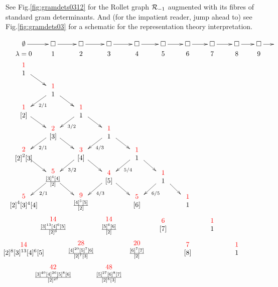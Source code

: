 \documentclass{article}
\theoremstyle{definition}
\numberwithin{equation}{subsection}
\begin{document}
See Fig.\ref{fig:gramdets0312} for the Rollet graph ${\mathcal{R}}_{-1}$ augmented with its fibres of standard gram determinants.
And 
(for the impatient reader, jump ahead to)
see Fig.\ref{fig:gramdets03} for a schematic for the representation theory interpretation. 

\begin{figure} 

%
\newcommand{\du}[2]{\begin{array}{c} \textcolor{red}{{#1}} \\ \hspace{-.321in}{#2}\hspace{-.321in} \end{array}}
\newcommand{\sqrr}{\square\ar[r]}
%
%
\[ { } \hspace{-.253in}
%
\xymatrix @C=15pt @R=1pt {
  {\emptyset}\ar[r] & \sqrr & \sqrr & \sqrr & \sqrr & \sqrr & \sqrr & \sqrr & \sqrr & \sqrr & { }
  \\
  {\lambda=0  }       &  1             &  2      &  3  &  4  &  5   & 6 & 7 & 8 & 9 
  \\  %
    {\du{1}{1} }\ar[dr]
    \\
& {\du{1}{1}}\ar[dr]\ar[dl]^{2/1}
\\ 
{\du{1}{{[2]}} }\ar[dr]    &                  &
{\du{1}{1}}\ar[dr]\ar[dl]^{3/2}
\\
&{\du{2}{[3]}} \ar[dr]\ar[dl]^{2/1}               &     &
{\du{1}{1}}\ar[dr]\ar[dl]^{4/3}
\\ 
{ \du{2}{{[ 2]}^2 [3]}}  \ar[dr]  &                     &
{\du{3}{[4]} }  \ar[dr]\ar[dl]^{3/2}  &    &
{\du{1}{1} } \ar[dr]\ar[dl]^{5/4}
\\
    & {\du{5}{{\frac{ [3]^4 [4]}{[2]}^{}}}}  \ar[dr]\ar[dl]^{2/1}   &  &
    {\du{4}{[5]}} \ar[dr]\ar[dl]^{4/3} &  &
    {\du{1}{1}} \ar[dr]\ar[dl]^{6/5}
    \\ 
    {\du{5}{{[2]}^4 [3]^4 [4]}} &              &
    {\du{9}{{\frac{[4]^5[5]}{[2]}^{}}}} &    &
    {\du{5}{[6]}} & &{ \du{1}{1} }
    \\ 
    &{\du{14}{\frac{[3]^{13}[4]^6[5]}{[2]^{6}}}} &&
    {\du{14}{\frac{[5]^6[6]}{[2]^{}}}} &&
    {\du{6}{[7]}} &&
    {\du{1}{1}}
 \\
   {\du{14}{[2]^8[3]^{13}[4]^6[5]}}  &&
   {\du{28}{\frac{[4]^{20}[5]^7[6]}{[2]^{7}[3]^{}}}} &&
   {\du{20}{\frac{[6]^7[7]}{[2]^{}}}} &&
   {\du{7}{[8]}}  &&
   {\du{1}{1}} \\
   & {\du{42}{\frac{[3]^{40}[4]^{26}[5]^8[6]}{[2]^{27}}}} &&
   {\du{48}{\frac{[5]^{27}[6]^8[7]}{[2]^{8}[3]^{}}}} &&
}\]
\end{figure}
\end{document}
